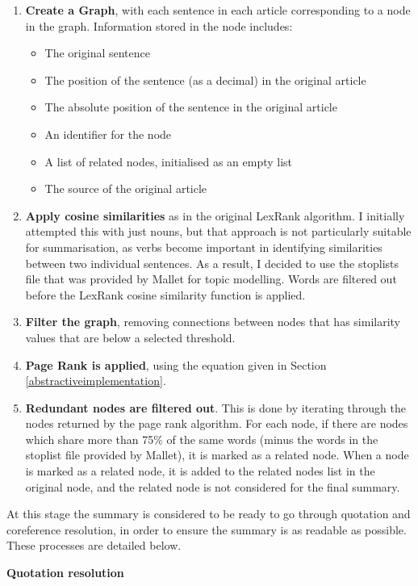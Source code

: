 \documentclass[12pt]{article}
\begin{document}
\begin{enumerate}
	\item \textbf{Create a Graph}, with each sentence in each article corresponding to a node in the graph. Information stored in the node includes:
		\begin{itemize}
			\item The original sentence
			\item The position of the sentence (as a decimal) in the original article
			\item The absolute position of the sentence in the original article
			\item An identifier for the node
			\item A list of related nodes, initialised as an empty list
			\item The source of the original article 
		\end{itemize}
	\item \textbf{Apply cosine similarities} as in the original LexRank algorithm. I initially attempted this with just nouns, but that approach is not particularly suitable for summarisation, as verbs become important in identifying similarities between two individual sentences. As a result, I decided to use the stoplists file that was provided by Mallet for topic modelling. Words are filtered out before the LexRank cosine similarity function is applied. 
	\item \textbf{Filter the graph}, removing connections between nodes that has similarity values that are below a selected threshold. 
	\item \textbf{Page Rank is applied}, using the equation given in Section \ref{abstractiveimplementation}. 
	\item \textbf{Redundant nodes are filtered out}. This is done by iterating through the nodes returned by the page rank algorithm. For each node, if there are nodes which share more than 75\% of the same words (minus the words in the stoplist file provided by Mallet), it is marked as a related node. When a node is marked as a related node, it is added to the related nodes list in the original node, and the related node is not considered for the final summary. 
\end{enumerate}

At this stage the summary is considered to be ready to go through quotation and coreference resolution, in order to ensure the summary is as readable as possible. These processes are detailed below.

\textbf{Quotation resolution}
\end{document}
